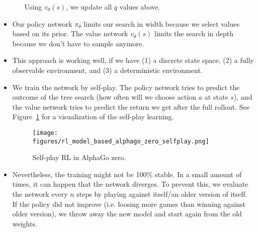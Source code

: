 \begin{itemize}
\begin{enumerate}
		Using $v_{\theta}(s)$, we update all $q$ values above.
	\end{enumerate}  
	\item Our policy network $\pi_{\theta}$ limits our search in width because we select values based on its prior. The value network $v_{\theta}(s)$ limits the search in depth because we don't have to sample anymore.
	\item This approach is working well, if we have (1) a discrete state space, (2) a fully observable environment, and (3) a deterministic environment.
	\item We train the network by self-play. The policy network tries to predict the outcome of the tree search (how often will we choose action $a$ at state $s$), and the value network tries to predict the return we get after the full rollout. See Figure~\ref{fig:rl_model_based_alphago_zero_selfplay} for a visualization of the self-play learning.
	\begin{figure}[ht!]
		\centering
		\texttt{[image: figures/rl\_model\_based\_alphago\_zero\_selfplay.png]}
		\caption{Self-play RL in AlphaGo zero.}
		\label{fig:rl_model_based_alphago_zero_selfplay}
	\end{figure}
	\item Nevertheless, the training might not be 100\% stable. In a small amount of times, it can happen that the network diverges. To prevent this, we evaluate the network every $n$ steps by playing against itself/an older version of itself. If the policy did not improve (i.e. loosing more games than winning against older version), we throw away the new model and start again from the old weights. 
\end{itemize}

